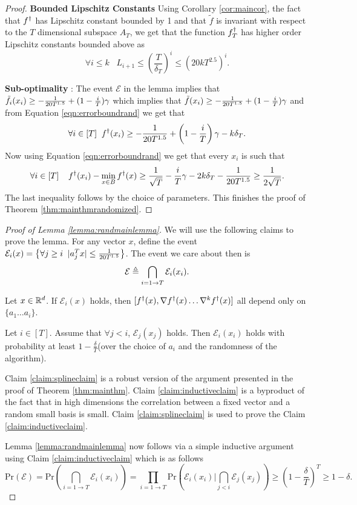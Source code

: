 \begin{proof}
\noindent \textbf{Bounded Lipschitz Constants} Using Corollary \ref{cor:maincor}, the fact that $f^{\dagger}$ has Lipschitz constant bounded by 1 and that $\tilde{f}$ is invariant with respect to the $T$ dimensional subspace $A_T$, we get that the function $f^{\dagger}_T$ has higher order Lipschitz constants bounded above as
\[ \forall i \leq k \;\;\; L_{i+1} \leq \left(\frac{T}{\delta_T}\right)^i \leq \left(20kT^{2.5}\right)^i.\] 

\noindent\textbf{Sub-optimality} : The event $\mathcal{E}$ in the lemma implies that $\tilde{f}_i(x_i) \geq -\frac{1}{20T^{1.5}} + (1 - \frac{i}{T})\gamma$ which implies that $\tilde{f}(x_i) \geq -\frac{1}{20T^{1.5}} + (1 - \frac{i}{T})\gamma$ and from Equation \eqref{eqn:errorboundrand} we get that 
\[ \forall i \in [T]\;\; f^{\dagger}(x_i) \geq -\frac{1}{20T^{1.5}} + \left(1 - \frac{i}{T}\right)\gamma - k\delta_T.\]
Now using Equation \eqref{eqn:errorboundrand} we get that every $x_i$ is such that
\[ \forall i \in [T]\;\;\;\; f^{\dagger}(x_i) - \min_{x \in B} f^{\dagger}(x) \geq \frac{1}{\sqrt{T}} - \frac{i}{T}\gamma - 2k\delta_T - \frac{1}{20T^{1.5}} \geq \frac{1}{2\sqrt{T}}.\]
The last inequality follows by the choice of parameters.
This finishes the proof of Theorem \ref{thm:mainthmrandomized}.
\end{proof}
\begin{proof}[Proof of Lemma \ref{lemma:randmainlemma}]
  We will use the following claims to prove the lemma. For any vector $x$, define the event $\mathcal{E}_i(x) = \big\{ \forall j \geq i\;\;|a_j^Tx| \leq \frac{1}{20T^{1.5}} \big\}$. The event we care about then is 
  \[ \mathcal{E} \triangleq \bigcap_{i = 1 \rightarrow T} \mathcal{E}_i(x_i).\]

  \begin{claim}
  \label{claim:splineclaim}
      Let $x \in {\mathbb R}^d$. If $\mathcal{E}_i(x)$ holds, then $[f^{\dagger}(x), \nabla f^{\dagger}(x) \ldots \nabla^k f^{\dagger}(x)]$ all depend only on $\{ a_1 \ldots a_i\}$. 
    \end{claim}
  \begin{claim}
  \label{claim:inductiveclaim}
      Let $i \in [T]$. Assume that $\forall j < i$, $\mathcal{E}_j(x_j)$ holds. Then $\mathcal{E}_{i}(x_{i})$ holds with probability at least $1 - \frac{\delta}{T}$(over the choice of $a_i$ and the randomness of the algorithm).
    \end{claim}
    Claim \ref{claim:splineclaim} is a robust version of the argument presented in the proof of Theorem \ref{thm:mainthm}. Claim \ref{claim:inductiveclaim} is a byproduct of the fact that in high dimensions the correlation between a fixed vector and a random small basis is small. Claim \ref{claim:splineclaim} is used to prove the Claim \ref{claim:inductiveclaim}.

  Lemma \ref{lemma:randmainlemma} now follows via a simple inductive argument using Claim \ref{claim:inductiveclaim} which is as follows
      \[ \mathrm{Pr}(\mathcal{E}) = \mathrm{Pr} \left(\bigcap_{i = 1 \rightarrow T} \mathcal{E}_i(x_i)\right) = \prod_{i=1 \rightarrow T}\mathrm{Pr}\left(\mathcal{E}_i(x_i) \big| \bigcap_{j < i} \mathcal{E}_j(x_j)\right) \geq \left(1 - \frac{\delta}{T}\right)^T \geq 1 - \delta.\] 
\end{proof}
